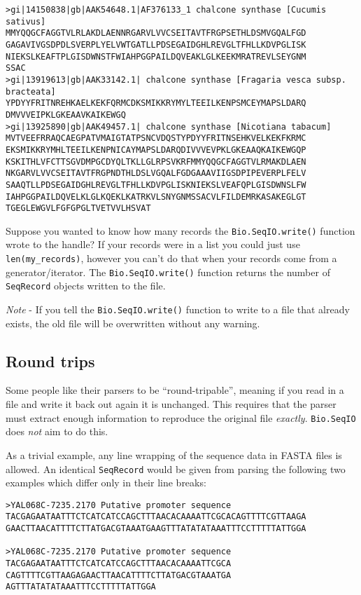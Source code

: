 \documentclass{report}
\begin{document}
\begin{verbatim}
>gi|14150838|gb|AAK54648.1|AF376133_1 chalcone synthase [Cucumis sativus]
MMYQQGCFAGGTVLRLAKDLAENNRGARVLVVCSEITAVTFRGPSETHLDSMVGQALFGD
GAGAVIVGSDPDLSVERPLYELVWTGATLLPDSEGAIDGHLREVGLTFHLLKDVPGLISK
NIEKSLKEAFTPLGISDWNSTFWIAHPGGPAILDQVEAKLGLKEEKMRATREVLSEYGNM
SSAC
>gi|13919613|gb|AAK33142.1| chalcone synthase [Fragaria vesca subsp. bracteata]
YPDYYFRITNREHKAELKEKFQRMCDKSMIKKRYMYLTEEILKENPSMCEYMAPSLDARQ
DMVVVEIPKLGKEAAVKAIKEWGQ
>gi|13925890|gb|AAK49457.1| chalcone synthase [Nicotiana tabacum]
MVTVEEFRRAQCAEGPATVMAIGTATPSNCVDQSTYPDYYFRITNSEHKVELKEKFKRMC
EKSMIKKRYMHLTEEILKENPNICAYMAPSLDARQDIVVVEVPKLGKEAAQKAIKEWGQP
KSKITHLVFCTTSGVDMPGCDYQLTKLLGLRPSVKRFMMYQQGCFAGGTVLRMAKDLAEN
NKGARVLVVCSEITAVTFRGPNDTHLDSLVGQALFGDGAAAVIIGSDPIPEVERPLFELV
SAAQTLLPDSEGAIDGHLREVGLTFHLLKDVPGLISKNIEKSLVEAFQPLGISDWNSLFW
IAHPGGPAILDQVELKLGLKQEKLKATRKVLSNYGNMSSACVLFILDEMRKASAKEGLGT
TGEGLEWGVLFGFGPGLTVETVVLHSVAT
\end{verbatim}

Suppose you wanted to know how many records the \verb|Bio.SeqIO.write()| function wrote to the handle?
If your records were in a list you could just use \verb|len(my_records)|, however you can't do that when your records come from a generator/iterator.  The \verb|Bio.SeqIO.write()| function returns the number of \verb|SeqRecord| objects written to the file.   

\emph{Note} - If you tell the \verb|Bio.SeqIO.write()| function to write to a file that already exists, the old file will be overwritten without any warning.

\subsection{Round trips}

Some people like their parsers to be ``round-tripable'', meaning if you read in
a file and write it back out again it is unchanged. This requires that the parser
must extract enough information to reproduce the original file \emph{exactly}.
\verb|Bio.SeqIO| does \emph{not} aim to do this.

As a trivial example, any line wrapping of the sequence data in FASTA files is
allowed. An identical \verb|SeqRecord| would be given from parsing the following
two examples which differ only in their line breaks:

\begin{verbatim}
>YAL068C-7235.2170 Putative promoter sequence
TACGAGAATAATTTCTCATCATCCAGCTTTAACACAAAATTCGCACAGTTTTCGTTAAGA
GAACTTAACATTTTCTTATGACGTAAATGAAGTTTATATATAAATTTCCTTTTTATTGGA

>YAL068C-7235.2170 Putative promoter sequence
TACGAGAATAATTTCTCATCATCCAGCTTTAACACAAAATTCGCA
CAGTTTTCGTTAAGAGAACTTAACATTTTCTTATGACGTAAATGA
AGTTTATATATAAATTTCCTTTTTATTGGA
\end{verbatim}
\end{document}

